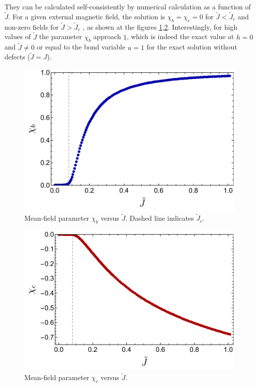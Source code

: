 They can be calculated self-consistently by numerical calculation as a function of $\tilde{J}$. %
For a given external magnetic field, the solution is $\chi_b=\chi_c=0$ for $\tilde{J}<\tilde{J}_c$ and non-zero fields for $\tilde{J}>\tilde{J}_c$ , as shown at the figures \ref{fig:4-b},\ref{fig:4-c}. Interestingly, for high values of $\tilde{J}$ the parameter $\chi_b$ approach $1$, which is indeed the exact value at $h=0$ and $\tilde{J} \neq 0$ or equal to the bond variable $u=1$ for the exact solution without defects ($\tilde{J} = J$).

\begin{figure}[h]
    \centering
    \includegraphics[width= .7\textwidth]{images/CH4/b.pdf}
    \caption{Mean-field parameter $\chi_b$ versus $\tilde{J}$. Dashed line indicates $\tilde{J}_c$.}
    \label{fig:4-b}
\end{figure}
\begin{figure}[h]
    \centering
    \includegraphics[width= .7\textwidth]{images/CH4/c.pdf}
    \caption{Mean-field parameter $\chi_c$ versus $\tilde{J}$.}
    \label{fig:4-c}
\end{figure}

